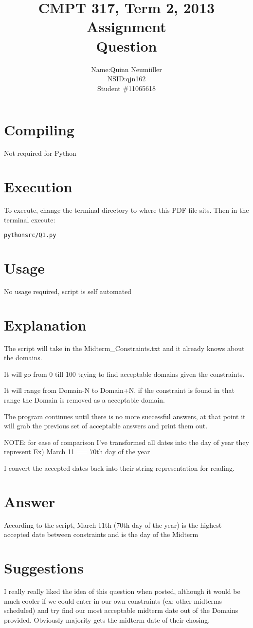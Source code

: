 \documentclass{article}
\title{CMPT 317, Term 2, 2013\\
Assignment \AssignmentNum\\
Question \QuestionNum\\
\AssignmentTitle
}
\author{
	\begin{tabular}{ l r }
	  Name: & Quinn Neumiiller \\
	  NSID: & qjn162 \\
	  Student \# & 11065618 \\
	\end{tabular}
}
\date{\AssignmentDate}
\newcommand{\QuestionNum}{1}
\begin{document}
   \maketitle
   
   \section{Compiling}
   Not required for Python

   \section{Execution}
   To execute, change the terminal directory to where this PDF file sits.
   Then in the terminal execute:
	\begin{alltt}
	python src/Q\QuestionNum.py
	\end{alltt}

  \section{Usage}
    No usage required, script is self automated
  \section{Explanation}
    The script will take in the Midterm\_Constraints.txt and it already knows about the domains.

    It will go from 0 till 100 trying to find acceptable domains given the constraints.

    It will range from Domain-N to Domain+N, if the constraint is found in that range the
    Domain is removed as a acceptable domain.

    The program continues until there is no more successful answers, at that point it will grab the previous
    set of acceptable answers and print them out.

    NOTE: for ease of comparison I've transformed all dates into the day of year they represent
    Ex) March 11 == 70th day of the year

    I convert the accepted dates back into their string representation for reading.
  \section{Answer}
    According to the script, March 11th (70th day of the year) is the highest accepted 
    date between constraints and is the day of the Midterm

  \section{Suggestions}
    I really really liked the idea of this question when posted, although it would be much cooler
    if we could enter in our own constraints (ex: other midterms scheduled) and try find our most
    acceptable midterm date out of the Domains provided. Obviously majority gets the midterm date of their chosing.
\end{document}
